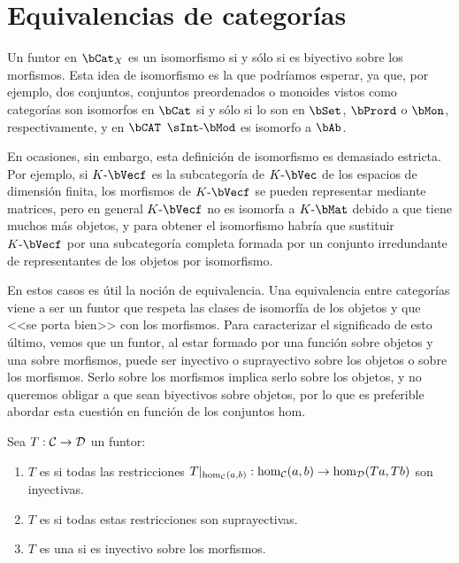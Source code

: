 \section{Equivalencias de categorías}

Un funtor en $\bCat_X$ es un isomorfismo si y sólo si es biyectivo sobre los
morfismos. Esta idea de isomorfismo es la que podríamos esperar, ya que, por
ejemplo, dos conjuntos, conjuntos preordenados o monoides vistos como categorías
son isomorfos en $\bCat$ si y sólo si lo son en $\bSet$, $\bPrord$ o $\bMon$,
respectivamente, y en $\bCAT$ $\sInt\dash\bMod$ es isomorfo a $\bAb$.

En ocasiones, sin embargo, esta definición de isomorfismo es demasiado
estricta. Por ejemplo, si $K\dash\bVecf$ es la subcategoría de $K\dash\bVec$ de
los espacios de dimensión finita, los morfismos de $K\dash\bVecf$ se pueden
representar mediante matrices, pero en general $K\dash\bVecf$ no es isomorfa a
$K\dash\bMat$ debido a que tiene muchos más objetos, y para obtener el
isomorfismo habría que sustituir $K\dash\bVecf$ por una subcategoría completa
formada por un conjunto irredundante de representantes de los objetos por
isomorfismo.

En estos casos es útil la noción de equivalencia. Una equivalencia entre
categorías viene a ser un funtor que respeta las clases de isomorfía de los
objetos y que <<se porta bien>> con los morfismos. Para caracterizar el
significado de esto último, vemos que un funtor, al estar formado por una
función sobre objetos y una sobre morfismos, puede ser inyectivo o suprayectivo
sobre los objetos o sobre los morfismos. Serlo sobre los morfismos implica serlo
sobre los objetos, y no queremos obligar a que sean biyectivos sobre objetos,
por lo que es preferible abordar esta cuestión en función de los conjuntos hom.

\begin{definition}
  Sea $T:\mathcal{C}\to\mathcal{D}$ un funtor:
  \begin{enumerate}
  \item $T$ es  si todas las restricciones
    $T|_{\hom_{\mathcal{C}}(a,b)}:\hom_{\mathcal{C}}(a,b)\to\hom_{\mathcal{D}}(Ta,Tb)$ son inyectivas.
  \item $T$ es  si todas estas restricciones son suprayectivas.
  \item $T$ es una  si es inyectivo sobre los morfismos.
  \end{enumerate}
\end{definition}

